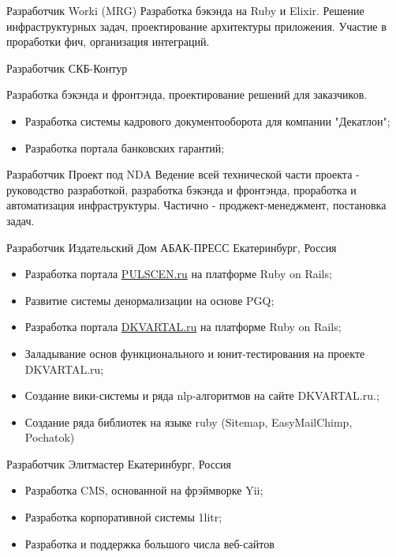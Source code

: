 \documentclass[11pt,a4paper]{moderncv}
\begin{document}
  {Разработчик}{}
  {Worki (MRG)}
  {}
{
Разработка бэкэнда на Ruby и Elixir. Решение инфраструктурных задач, проектирование архитектуры приложения. Участие в проработки фич, организация интеграций.
}
\clearpage

  {Разработчик}{}
  {СКБ-Контур}
  {}
{
Разработка бэкэнда и фронтэнда, проектирование решений для заказчиков.
\begin{itemize}
\item Разработка системы кадрового документооборота для компании "Декатлон";
\item Разработка портала банковских гарантий;
\end{itemize}
}

  {Разработчик}{}
  {Проект под NDA}
  {}
{
Ведение всей технической части проекта - руководство разработкой, разработка бэкэнда и фронтэнда, проработка и автоматизация инфраструктуры. Частично - проджект-менеджмент, постановка задач.
}

  {Разработчик}{}
  {Издательский Дом АБАК-ПРЕСС}
  {Екатеринбург, Россия}
{
\begin{itemize}
  \item Разработка портала \href{http://pulscen.ru}{PULSCEN.ru} на платформе Ruby on Rails;
  \item Развитие системы денормализации на основе PGQ;
  \item Разработка портала \href{http://dkvartal.ru}{DKVARTAL.ru} на платформе Ruby on Rails;
  \item Заладывание основ функционального и юнит-тестирования на проекте {DKVARTAL.ru};
  \item Создание вики-системы и ряда nlp-алгоритмов на сайте {DKVARTAL.ru}.;
  \item Создание ряда библиотек на языке ruby (Sitemap, EasyMailChimp, Pochatok)
\end{itemize}
}

\cvitem {}{}

  {Разработчик}{}
  {Элитмастер}
  {Екатеринбург, Россия}
{
\begin{itemize}
  \item Разработка CMS, основанной на фрэймворке Yii;
  \item Разработка корпоративной системы {1litr};
  \item Разработка и поддержка большого числа веб-сайтов
\end{itemize}
}
\end{document}
